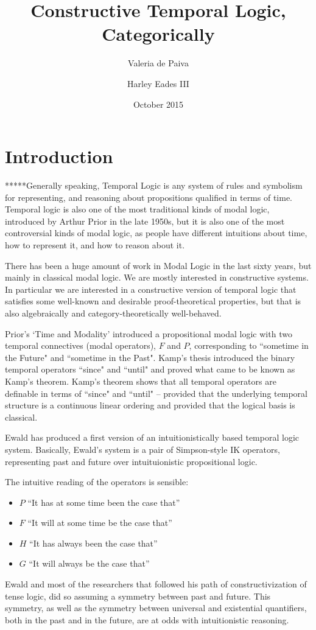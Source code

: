 \documentclass{article}
\title{Constructive Temporal Logic, Categorically}
\author{Valeria de Paiva \and Harley Eades III}
\date{October 2015}
\begin{document}
\maketitle

\section{Introduction}
*****Generally speaking, Temporal Logic is any system of rules and
symbolism for representing, and reasoning about propositions qualified in terms of time.  Temporal logic is also one of the most traditional kinds of modal logic, introduced by Arthur Prior in the late 1950s,
but it is also one of the most controversial kinds of modal logic, as people have different intuitions about time, how to represent it, and  how to reason about it.

There has been a huge amount of work in Modal Logic in the last sixty years, but mainly in classical modal logic. We are mostly interested in constructive systems. In particular we are interested in a constructive version of temporal logic that satisfies some well-known and desirable proof-theoretical properties, but that is also algebraically and category-theoretically well-behaved.

Prior's `Time and Modality' introduced a propositional modal logic with two temporal connectives (modal operators), $F$ and $P$, corresponding to ``sometime in the {F}uture" and ``sometime in the {P}ast". Kamp's thesis introduced the binary temporal operators ``since" and ``until" and proved what came to be known as Kamp's theorem. Kamp's theorem shows that all temporal operators are definable in terms of ``since" and ``until" -- provided that the underlying temporal structure is a continuous linear ordering and provided that the logical basis is classical.

Ewald \cite{ewald1986} has produced a first version of an intuitionistically based temporal logic system. Basically, Ewald's system is a pair of Simpson-style IK
operators\cite{simpson1994}, representing past and future over
intuituionistic propositional logic.

The intuitive reading of the operators is sensible:
\begin{itemize}
\item $P$ “It has at some time been the case that” 
\item $F$ “It will at some time be the case that” 
\item $H$ “It has always been the case that” 
\item $G$  “It will always be the case that” 
\end{itemize}
Ewald and most of the researchers that followed his path of
constructivization of tense logic, did so assuming a symmetry between past and future. This symmetry, as well as the symmetry between universal and existential
quantifiers, both in the past and in the future, are at odds with
intuitionistic reasoning.
\end{document}
